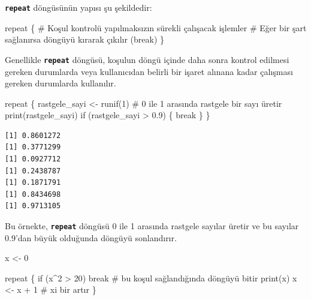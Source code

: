 \documentclass[
  letterpaper,
  DIV=11,
  numbers=noendperiod]{scrreprt}
\newenvironment{Shaded}{\begin{snugshade}}{\end{snugshade}}
\newcommand{\CommentTok}[1]{\textcolor[rgb]{0.37,0.37,0.37}{#1}}
\newcommand{\ControlFlowTok}[1]{\textcolor[rgb]{0.00,0.23,0.31}{#1}}
\newcommand{\DecValTok}[1]{\textcolor[rgb]{0.68,0.00,0.00}{#1}}
\newcommand{\FloatTok}[1]{\textcolor[rgb]{0.68,0.00,0.00}{#1}}
\newcommand{\FunctionTok}[1]{\textcolor[rgb]{0.28,0.35,0.67}{#1}}
\newcommand{\NormalTok}[1]{\textcolor[rgb]{0.00,0.23,0.31}{#1}}
\newcommand{\OtherTok}[1]{\textcolor[rgb]{0.00,0.23,0.31}{#1}}
\newcommand{\SpecialCharTok}[1]{\textcolor[rgb]{0.37,0.37,0.37}{#1}}
\begin{document}
\textbf{\texttt{repeat}} döngüsünün yapısı şu şekildedir:

\begin{Shaded}
\begin{Highlighting}[]
\ControlFlowTok{repeat}\NormalTok{ \{}
  \CommentTok{\# Koşul kontrolü yapılmaksızın sürekli çalışacak işlemler}
  \CommentTok{\# Eğer bir şart sağlanırsa döngüyü kırarak çıkılır (break)}
\NormalTok{\}}
\end{Highlighting}
\end{Shaded}

Genellikle \textbf{\texttt{repeat}} döngüsü, koşulun döngü içinde daha
sonra kontrol edilmesi gereken durumlarda veya kullanıcıdan belirli bir
işaret alınana kadar çalışması gereken durumlarda kullanılır.

\begin{Shaded}
\begin{Highlighting}[]
\ControlFlowTok{repeat}\NormalTok{ \{}
\NormalTok{  rastgele\_sayi }\OtherTok{\textless{}{-}} \FunctionTok{runif}\NormalTok{(}\DecValTok{1}\NormalTok{)  }\CommentTok{\# 0 ile 1 arasında rastgele bir sayı üretir}
  \FunctionTok{print}\NormalTok{(rastgele\_sayi)}
  \ControlFlowTok{if}\NormalTok{ (rastgele\_sayi }\SpecialCharTok{\textgreater{}} \FloatTok{0.9}\NormalTok{) \{}
    \ControlFlowTok{break}
\NormalTok{  \}}
\NormalTok{\}}
\end{Highlighting}
\end{Shaded}

\begin{verbatim}
[1] 0.8601272
[1] 0.3771299
[1] 0.0927712
[1] 0.2438787
[1] 0.1871791
[1] 0.8434698
[1] 0.9713105
\end{verbatim}

Bu örnekte, \textbf{\texttt{repeat}} döngüsü 0 ile 1 arasında rastgele
sayılar üretir ve bu sayılar 0.9'dan büyük olduğunda döngüyü
sonlandırır.

\begin{Shaded}
\begin{Highlighting}[]
\NormalTok{x }\OtherTok{\textless{}{-}} \DecValTok{0}

\ControlFlowTok{repeat}\NormalTok{ \{}
    \ControlFlowTok{if}\NormalTok{ (x}\SpecialCharTok{\^{}}\DecValTok{2} \SpecialCharTok{\textgreater{}} \DecValTok{20}\NormalTok{) }\ControlFlowTok{break}     \CommentTok{\# bu koşul sağlandığında döngüyü bitir}
    \FunctionTok{print}\NormalTok{(x)               }
\NormalTok{    x }\OtherTok{\textless{}{-}}\NormalTok{ x }\SpecialCharTok{+} \DecValTok{1}              \CommentTok{\# x\textquotesingle{}i bir artır}
\NormalTok{\}}
\end{Highlighting}
\end{Shaded}
\end{document}
